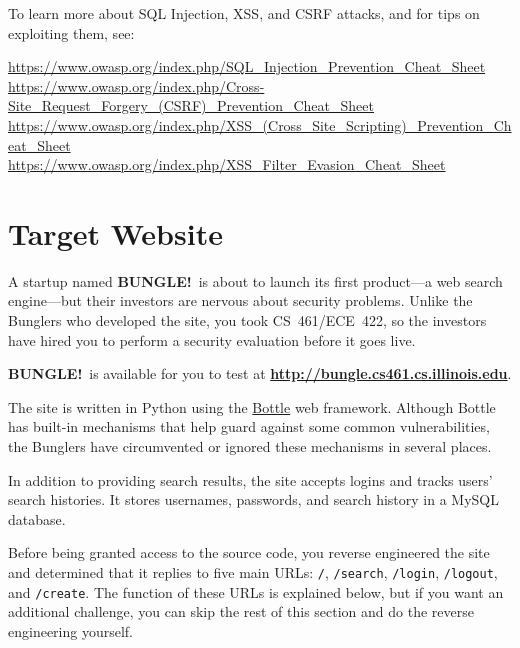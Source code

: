 \documentclass[letterpaper,12pt]{report}
\newcommand{\bungledomain}{http://bungle.cs461.cs.illinois.edu}
\begin{document}
To learn more about SQL Injection, XSS, and CSRF attacks, and for tips on exploiting them, see:
\medskip

\url{https://www.owasp.org/index.php/SQL_Injection_Prevention_Cheat_Sheet}\\
\url{https://www.owasp.org/index.php/Cross-Site_Request_Forgery_(CSRF)_Prevention_Cheat_Sheet}\\
\url{https://www.owasp.org/index.php/XSS_(Cross_Site_Scripting)_Prevention_Cheat_Sheet}\\
\url{https://www.owasp.org/index.php/XSS_Filter_Evasion_Cheat_Sheet}\\

\newpage


\section*{Target Website}
\newcommand{\note}[1]{\textsl{#1}}
\newcommand\bungle{\textsf{\bfseries{B{\scriptsize UNGLE}!}}}

A startup named \bungle\ is about to launch its first product---a web search engine---but their investors are nervous about security problems.  Unlike the Bunglers who developed the site, you took CS~461/ECE~422, so the investors have hired you to perform a security evaluation before it goes live.

\medskip

\bungle\ is available for you to test at \textbf{\url{\bungledomain}}.

\medskip

The site is written in Python using the \href{http://bottlepy.org/docs/dev/index.html}{Bottle} web framework. Although Bottle has built-in mechanisms that help guard against some common vulnerabilities, the Bunglers have circumvented or ignored these mechanisms in several places.

\medskip

In addition to providing search results, the site accepts logins and tracks users' search histories. It stores usernames, passwords, and search history in a MySQL database.

\medskip

Before being granted access to the source code, you reverse engineered the site and determined that it replies to five main URLs: \texttt{/}, \texttt{/search}, \texttt{/login}, \texttt{/logout}, and \texttt{/create}.  The function of these URLs is explained below, but if you want an additional challenge, you can skip the rest of this section and do the reverse engineering yourself.
\end{document}
